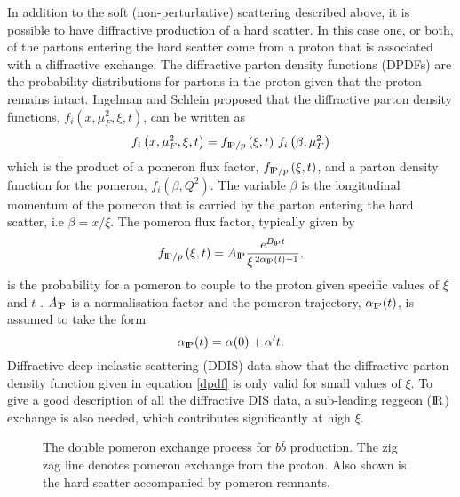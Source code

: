 In addition to the soft (non-perturbative) scattering described above, it is possible to have diffractive production of a hard scatter. In this case one, or both, of the partons entering the hard scatter come from a proton that is associated with a diffractive exchange. The diffractive parton density functions (DPDFs) are the probability distributions for partons in the proton given that the proton 
remains intact. Ingelman and Schlein  proposed \cite{Ingelman:1984ns} that the diffractive parton density functions, $f_i(x,\mu_F^2, \xi, t)$, can be written as 
\begin{equation} \label{dpdf}
f_i \left(x,\mu_F^2, \xi, t \right) = f_{\text{I$\!$P}/p} \left( \xi , t \right) \, f_i \left(\beta, \mu_F^2 \right)
\end{equation}
which is the product of a pomeron flux factor, $f_{\text{I$\!$P}/p} \left( \xi , t \right)$, and a parton density function for the pomeron, $f_i \left(\beta, Q^2 \right)$. The variable $\beta$ is the longitudinal momentum of the pomeron that is carried by the parton entering the hard scatter, i.e $\beta = x/\xi$. The pomeron flux factor, typically given by
\begin{equation}\label{pomflux}
f_{\text{I$\!$P}/p} \left( \xi , t \right) = A_{\text{I$\!$P}} 
\frac{e^{B_{\text{I$\!$P}}t}}
{\xi^{\, 2\alpha_{\text{I$\!$P}} \left( t \right) - 1}},
\end{equation}
is the probability for a pomeron to couple to the proton given specific values of $\xi$ and $t$ \cite{Aktas:2006hy}. $A_{\text{I$\!$P}}$ is a normalisation factor and the pomeron trajectory, $\alpha_{\text{I$\!$P}}(t)$, is assumed to take the form 
\begin{equation}
\alpha_{\text{I$\!$P}}(t) = \alpha(0) + \alpha^{\prime} t. 
\end{equation}
Diffractive deep inelastic scattering (DDIS) data \cite{Aktas:2006hy,unknown:2006hx} show that the diffractive parton density function given in equation \ref{dpdf} is only valid for small values of $\xi$. To give a good description of all the diffractive DIS data, a sub-leading reggeon ($\text{I$\!$R}$) exchange is also needed, which contributes significantly at high $\xi$. 

\begin{figure} 
\centering
	\quad
\caption[The double pomeron exchange process]{The double pomeron exchange process for $b\bar{b}$ production. The zig zag line denotes  pomeron exchange from the proton. Also shown is the hard scatter accompanied by pomeron remnants. \label{dpefig}}
\end{figure}

